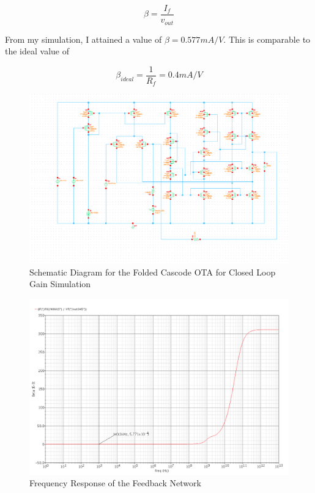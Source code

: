 \documentclass{article}
\begin{document}
\begin{equation}
\beta = \frac{I_f}{v_{out}}
\end{equation}

From my simulation, I attained a value of $\beta = 0.577mA/V$. This is comparable to the ideal value of

\begin{equation}
\beta_{ideal} = \frac{1}{R_f} = 0.4mA/V
\end{equation}

\begin{figure}[H]
\centering
\includegraphics[width=7in]{bullet6_schem.png}
\caption{Schematic Diagram for the Folded Cascode OTA for Closed Loop Gain Simulation}
\label{b6_schem}
\end{figure}

\begin{figure}[H]
\centering
\includegraphics[width=7in]{bullet6_beta.png}
\caption{Frequency Response of the Feedback Network}
\label{b6_beta}
\end{figure}
\end{document}
